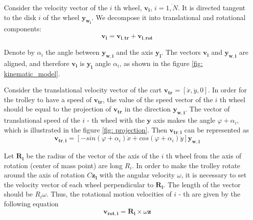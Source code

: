 \documentclass[oneside,final,14pt]{extreport}
\newcommand{\bs}{\boldsymbol}
\begin{document}
\begin{figure} [H]
\end{figure}

Consider the velocity vector of the $ i $ th wheel, $ \bs{v_{i}} $, $ i = \overline{1, N} $. It is directed tangent to the disk $ i $ of the  wheel  $ \bs{y_{w_i}} $. We decompose it into translational and rotational components:
\begin{equation}
\bs{v_{i}}
=
\bs{v_{i, tr}}
+
\bs{v_{i, rot}}
\end{equation}

Denote by $ \alpha_{i} $ the angle between $ \bs{y_{w, i}} $ and the axis $ \bs{y_{l}} $. The vectors $ \bs{v_{i}} $ and $ \bs{y_{w, i}} $ are aligned, and therefore $ \bs{v_{i}} $ is $ \bs{y_{l}} $ angle $ \alpha_{i} $, as shown in the figure \ref{fig: kinematic_model}.



Consider the translational velocity vector of the cart $ \bs{v_{tr}} = [\dot{x}, \dot{y}, 0] $. In order for the trolley to have a speed of $ \bs{v_{tr}} $, the value of the speed vector of the $ i $ th wheel should be equal to the projection of $ \bs{v_{tr}} $ in the direction $ \bs{y_{w , i}} $. The vector of translational speed of the $ i $ - th wheel with the $ \bs{y} $ axis makes the angle $ \varphi + \alpha_{i} $, which is illustrated in the figure \ref{fig: projection}. Then $ \bs{v_{tr, i}} $ can be represented as
\begin{equation}
\label{eq: v_rt_i_global}
\bs{v_{tr, i}}
=
[
-sin (\varphi + \alpha_{i})
\dot{x}
+
cos (\varphi + \alpha_{i})
\dot{y}
]
\bs{y_{w, i}}
\end{equation}



\begin{figure} [H]
\end{figure}

Let $ \bs{R_{i}} $ be the radius of the vector of the axis of the $ i $ th wheel from the axis of rotation (center of mass point) are long $ R_{i} $. In order to make the trolley rotate around the axis of rotation $ C \bs{z_{l}} $ with the angular velocity $ \omega $, it is necessary to set the velocity vector of each wheel perpendicular to $ \bs{R_{i}} $. The length of the vector should be $ R_{i} \omega $.
Thus, the rotational motion velocities of $ i $ - th are given by the following equation
\begin{equation}
\bs{v_{rot, i}}
=
\bs{R_{i}}
\times
\omega
\bs{z}
\end{equation}
\end{document}
